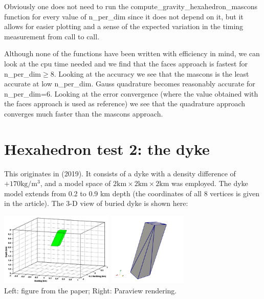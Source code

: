 Obviously one does not need to run the 
{\python compute\_gravity\_hexahedron\_mascons} function for every value of {\python n\_per\_dim}
since it does not depend on it, but it allows for easier plotting and a sense of the 
expected variation in the timing measurement from call to call. 

Although none of the functions have been written with efficiency in mind, 
we can look at the cpu time needed and we find that the {\python faces}
approach is fastest for {\python n\_per\_dim}$\ge 8$.
Looking at the accuracy we see that the mascons is the least accurate at low 
{\python n\_per\_dim}. Gauss quadrature becomes reasonably accurate for 
{\python n\_per\_dim}=6. 
Looking at the error convergence (where the value obtained with the faces approach is used 
as reference) we see that the quadrature approach converges much faster than the mascons approach.


\section*{Hexahedron test 2: the dyke}

This originates in \textcite{uwms19} (2019). 
It consists of a dyke with a density difference 
of $+170 \si{\kg\per\cubic\meter}$, and a model space of 
$2\si{\km} \times  2 \si{\km} \times 2 \si{\km}$  was employed. 
The dyke model extends from 0.2 to 0.9 km depth (the coordinates
of all 8 vertices is given in the article). The 3-D view of buried dyke is shown here:

\begin{center}
\includegraphics[height=3.5cm]{python_codes/fieldstone_113/images/uwms19_a}
\includegraphics[height=3.5cm]{python_codes/fieldstone_113/images/dyke}\\
{\captionfont Left: figure from the paper; Right: Paraview rendering.}
\end{center}

